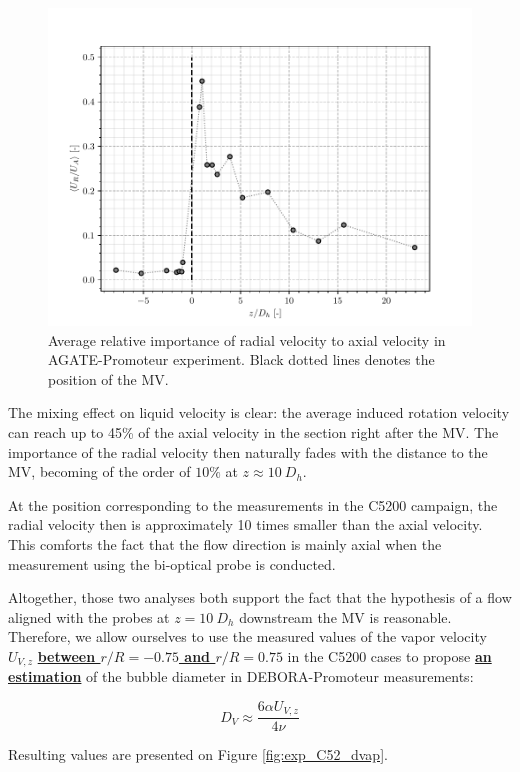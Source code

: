 \begin{figure}[!h]
\centering
\includegraphics[width=0.6\linewidth]{img/AGATE/Urap_z.pdf}
\caption{Average relative importance of radial velocity to axial velocity in AGATE-Promoteur experiment. Black dotted lines denotes the position of the MV.}
\label{fig:exp_agate_Urap_z}
\end{figure}


\npar

The mixing effect on liquid velocity is clear: the average induced rotation velocity can reach up to 45\% of the axial velocity in the section right after the MV. The importance of the radial velocity then naturally fades with the distance to the MV, becoming of the order of $10\%$ at $z\approx 10\ D_{h}$. 

\npar

At the position corresponding to the measurements in the C5200 campaign, the radial velocity then is approximately 10 times smaller than the axial velocity. This comforts the fact that the flow direction is mainly axial when the measurement using the bi-optical probe is conducted.

\npar

Altogether, those two analyses both support the fact that the hypothesis of a flow aligned with the probes at $z=10\ D_{h}$ downstream the MV is reasonable. Therefore, we allow ourselves to use the measured values of the vapor velocity $U_{V,z}$ \textbf{\underline{between $r/R=-0.75$ and $r/R=0.75$}} in the C5200 cases to propose \textbf{\underline{an estimation}} of the bubble diameter in DEBORA-Promoteur measurements:

\begin{equation}
D_{V} \approx \frac{6 \alpha U_{V,z}}{4\nu}
\end{equation}


Resulting values are presented on Figure \ref{fig:exp_C52_dvap}.

